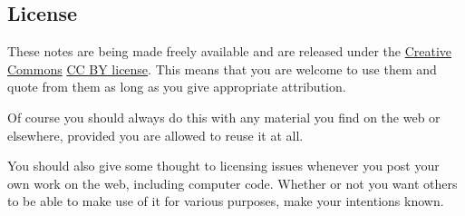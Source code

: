 \documentclass[letterpaper,10pt,english]{sphinxmanual}
\begin{document}
\subsection{License}
\label{about:id2}\label{about:license}
These notes are being made freely available and are released under the
\href{http://creativecommons.org/}{Creative Commons} \href{http://creativecommons.org/licenses/by/3.0/}{CC BY license}.
This means that you are welcome to use them and quote from them
as long as you give appropriate attribution.

Of course you should always do this with any material you find on the web or
elsewhere, provided you are allowed to reuse it at all.

You should also give some thought to licensing issues whenever you post your
own work on the web, including computer code.
Whether or not you want others to be able to make use
of it for various purposes, make your intentions known.
\end{document}

